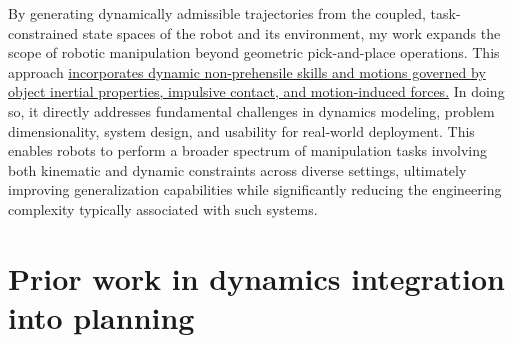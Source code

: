 By generating dynamically admissible trajectories from the coupled, task-constrained state spaces of the robot and its environment, my work expands the scope of robotic manipulation beyond geometric pick-and-place operations. This approach \ul{incorporates dynamic non-prehensile skills and motions governed by object inertial properties, impulsive contact, and motion-induced forces.} In doing so, it directly addresses fundamental challenges in dynamics modeling, problem dimensionality, system design, and usability for real-world deployment.
This enables robots to perform a broader spectrum of manipulation tasks involving both kinematic and dynamic constraints across diverse settings, ultimately improving generalization capabilities while significantly reducing the engineering complexity typically associated with such systems.




\section{Prior work in dynamics integration into planning}


